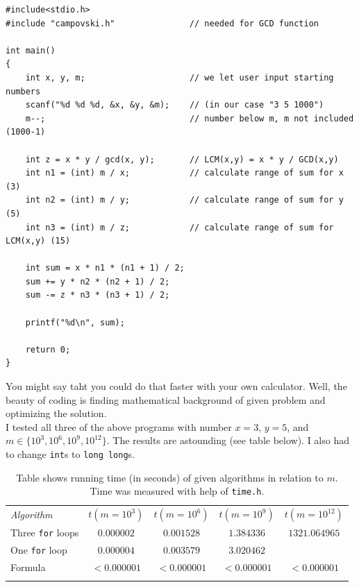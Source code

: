 \documentclass{book}
\begin{document}
\begin{verbatim}
#include<stdio.h>
#include "campovski.h"               // needed for GCD function

int main()
{
    int x, y, m;                     // we let user input starting numbers
    scanf("%d %d %d, &x, &y, &m);    // (in our case "3 5 1000")
    m--;                             // number below m, m not included (1000-1)
    
    int z = x * y / gcd(x, y);       // LCM(x,y) = x * y / GCD(x,y)
    int n1 = (int) m / x;            // calculate range of sum for x (3)
    int n2 = (int) m / y;            // calculate range of sum for y (5)
    int n3 = (int) m / z;            // calculate range of sum for LCM(x,y) (15)
    
    int sum = x * n1 * (n1 + 1) / 2;
    sum += y * n2 * (n2 + 1) / 2;
    sum -= z * n3 * (n3 + 1) / 2;
    
    printf("%d\n", sum);
    
    return 0; 
}
\end{verbatim}

You might say taht you could do that faster with your own calculator. Well, the beauty of coding is finding mathematical background of given problem and optimizing the solution.\\

I tested all three of the above programs with number $x = 3$, $y = 5$, and $m \in \{10^3, 10^6, 10^9, 10^{12}\}$. The results are astounding (see table below). I also had to change \texttt{int}s to \texttt{long long}s.

\begin{table}[h!]
\centering
\begin{tabular}{||l||c|c|c|c||}
\hhline{|t:=====:t|}
\textit{Algorithm} & $t(m = 10^3)$ & $t(m = 10^6)$ & $t(m=10^9)$ & $t(m=10^{12})$\\
\hhline{||=||=|=|=|=||}
Three \texttt{for} loops & $0.000002$ & $0.001528$ & $1.384336$ & $1321.064965$\\
\hline
One \texttt{for} loop & $0.000004$ & $0.003579$ & $3.020462$ & \\
\hline
Formula & $< 0.000001$ & $< 0.000001$ & $< 0.000001$ & $< 0.000001$\\
\hhline{|b:=====:b|}
\end{tabular}
\caption{Table shows running time (in seconds) of given algorithms in relation to $m$. Time was measured with help of \texttt{time.h}.}
\end{table}
\end{document}
